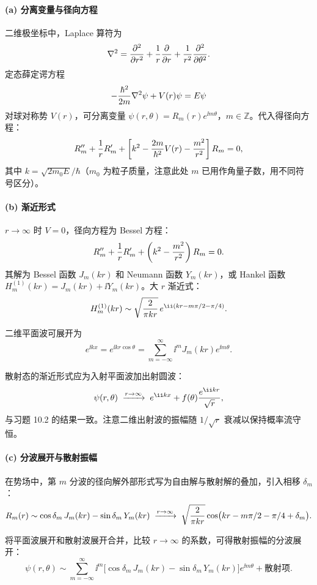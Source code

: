 \begin{solution}
\paragraph{(a) 分离变量与径向方程}

二维极坐标中，Laplace 算符为
\[
\nabla^2={\partial^2\over\partial r^2}+{1\over r}{\partial\over\partial r}+{1\over r^2}{\partial^2\over\partial\theta^2}.
\]
定态薛定谔方程
\[
-{\hbar^2\over2m}\nabla^2\psi+V(r)\psi=E\psi
\]
对球对称势 $V(r)$，可分离变量 $\psi(r,\theta)=R_m(r)e^{\ii m\theta}$，$m\in\mathbb Z$。代入得径向方程：
\[
R_m''+{1\over r}R_m'+\left[k^2-{2m\over\hbar^2}V(r)-{m^2\over r^2}\right]R_m=0,
\]
其中 $k=\sqrt{2m_0E}/\hbar$（$m_0$ 为粒子质量，注意此处 $m$ 已用作角量子数，用不同符号区分）。

\paragraph{(b) 渐近形式}

$r\to\infty$ 时 $V=0$，径向方程为 Bessel 方程：
\[
R_m''+{1\over r}R_m'+\left(k^2-{m^2\over r^2}\right)R_m=0.
\]
其解为 Bessel 函数 $J_m(kr)$ 和 Neumann 函数 $Y_m(kr)$，或 Hankel 函数 $H_m^{(1)}(kr)=J_m(kr)+\ii Y_m(kr)$。大 $r$ 渐近式：
\[
H_m^{(1)}(kr)\sim\sqrt{2\over\pi kr}\,e^{\ii(kr-m\pi/2-\pi/4)}.
\]

二维平面波可展开为
\[
e^{\ii kx}=e^{\ii kr\cos\theta}=\sum_{m=-\infty}^{\infty}\ii^m J_m(kr)e^{\ii m\theta}.
\]

散射态的渐近形式应为入射平面波加出射圆波：
\[
\psi(r,\theta)\;\xrightarrow{r\to\infty}\; e^{\ii kx}+f(\theta){e^{\ii kr}\over\sqrt r},
\]
与习题 10.2 的结果一致。注意二维出射波的振幅随 $1/\sqrt{r}$ 衰减以保持概率流守恒。

\paragraph{(c) 分波展开与散射振幅}

在势场中，第 $m$ 分波的径向解外部形式写为自由解与散射解的叠加，引入相移 $\delta_m$：
\[
R_m(r)\sim\cos\delta_m\,J_m(kr)-\sin\delta_m\,Y_m(kr)
\;\xrightarrow{r\to\infty}\;
\sqrt{2\over\pi kr}\cos\bigl(kr-m\pi/2-\pi/4+\delta_m\bigr).
\]

将平面波展开和散射波展开合并，比较 $r\to\infty$ 的系数，可得散射振幅的分波展开：
\[
\psi(r,\theta)\sim\sum_{m=-\infty}^{\infty}\ii^m\bigl[\cos\delta_m\,J_m(kr)-\sin\delta_m\,Y_m(kr)\bigr]e^{\ii m\theta}
+\text{散射项}.
\]


\end{solution}
